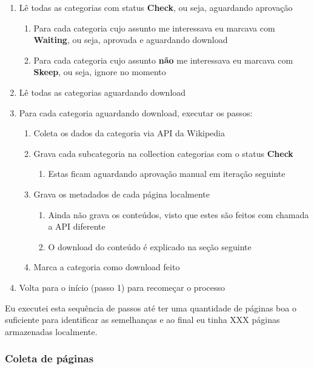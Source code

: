 \begin{enumerate}
    \item Lê todas as categorias com status \textbf{Check}, ou seja, aguardando aprovação
    \begin{enumerate}
        \item Para cada categoria cujo assunto me interessava eu marcava com \textbf{Waiting}, ou seja, aprovada e aguardando download
        \item Para cada categoria cujo assunto \textbf{não} me interessava eu marcava com \textbf{Skeep}, ou seja, ignore no momento
    \end{enumerate}
    \item Lê todas as categorias aguardando download
    \item Para cada categoria aguardando download, executar os passos: 
    \begin{enumerate}
        \item Coleta os dados da categoria via API da Wikipedia
        \item Grava cada subcategoria na collection categorias com o status \textbf{Check}
        \begin{enumerate}
            \item Estas ficam aguardando aprovação manual em iteração seguinte
        \end{enumerate}
        \item Grava os metadados de cada página localmente
        \begin{enumerate}
            \item Ainda não grava os conteúdos, visto que estes são feitos com chamada a API diferente
            \item O download do conteúdo é explicado na seção seguinte
        \end{enumerate}
        \item Marca a categoria como download feito
    \end{enumerate}
    \item Volta para o início (passo 1) para recomeçar o processo
\end{enumerate}

Eu executei esta sequência de passos até ter uma quantidade de páginas boa o suficiente para identificar as semelhanças e ao final eu tinha 
XXX páginas armazenadas localmente.

\subsubsection{Coleta de páginas}


